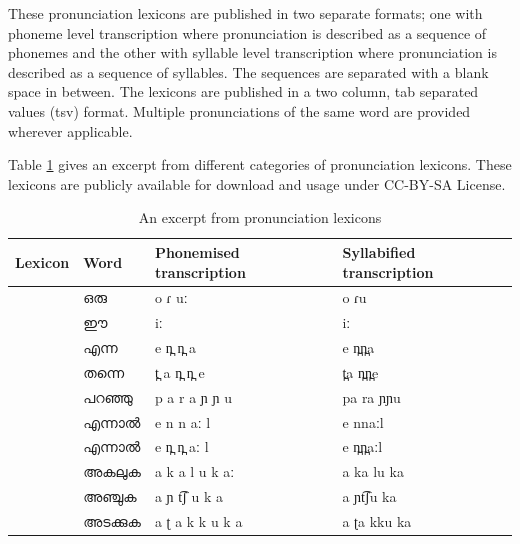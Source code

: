 \documentclass{ieeeaccess}
\begin{document}
These pronunciation lexicons are published in two separate formats; one with phoneme level transcription where pronunciation is described as a sequence of phonemes and the other with syllable level transcription where pronunciation is described as a sequence of syllables. The sequences are separated with a blank space in between. The lexicons are published in a two column, tab separated values (tsv) format. Multiple pronunciations of the same word are provided wherever applicable. 

Table \ref{lexiconsamples}  gives an excerpt from different categories of pronunciation lexicons. These lexicons are publicly available for download and usage under CC-BY-SA License.


\begin{table}[!h]
	\begin{center}
		\begin{minipage}{\textwidth}
			\caption{An excerpt from pronunciation lexicons}\label{lexiconsamples}
			\begin{tabular}{@{}p{1.2cm}p{1.5cm}p{2cm}p{2.2cm}@{}}
				\hline
				\hline
				Lexicon                      & Word              & Phonemised transcription          & Syllabified transcription  \\
				\hline
				\multirow{6}{*}{\rotatebox{60}{Common words}}   & {\mal ഒരു}         & {\ipa o ɾ uː}                     & {\ipa o ɾu}                \\
				                                & {\mal ഈ}          & {\ipa iː}                         & {\ipa iː}                  \\
				                                & {\mal എന്ന}        & {\ipa e n̪ n̪ a}                    & {\ipa e n̪n̪a}               \\
				                                & {\mal തന്നെ}       & {\ipa t̪ a n̪ n̪ e}                  & {\ipa t̪a n̪n̪e}              \\
				                                & {\mal പറഞ്ഞു}       & {\ipa p a r a ɲ ɲ u}              & {\ipa pa ra ɲɲu }          \\
				                                & {\mal എന്നാൽ}      & {\ipa e n n aː l}                 & {\ipa e nnaːl}             \\
				                                & {\mal എന്നാൽ}      & {\ipa e n̪ n̪ aː l}                 & {\ipa e n̪n̪aːl}             \\

				\hline
				\multirow{3}{*}{\rotatebox{60}{Verbs}}          & {\mal അകലുക}       & {\ipa a k a l u k aː}             & {\ipa a ka lu ka}          \\
				                                & {\mal അഞ്ചുക}       & {\ipa a ɲ t͡ʃ u k a}               & {\ipa a ɲt͡ʃu ka}           \\
				                                & {\mal അടക്കുക}      & {\ipa a ʈ a k k u k a   }         & {\ipa a ʈa kku ka}         \\


\end{tabular}
\end{minipage}
\end{center}
\end{table}
\end{document}
